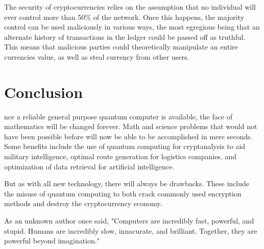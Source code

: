\documentclass[10pt,journal,compsoc]{IEEEtran}
\begin{document}
The security of cryptocurrencies relies on the assumption that no individual will ever control more than 50\% of the network\cite{Futurism}. Once this happens, the majority control can be used maliciously in various ways, the most egregious being that an alternate history of transactions in the ledger could be passed off as truthful. This means that malicious parties could theoretically manipulate an entire currencies value, as well as steal currency from other users. 







\section{Conclusion}
nce a reliable general purpose quantum computer is available, the face of mathematics will be changed forever. Math and science problems that would not have been possible before will now be able to be accomplished in mere seconds. Some benefits include the use of quantum computing for cryptanalysis to aid military intelligence, optimal route generation for logistics companies, and optimization of data retrieval for artificial intelligence. 

But as with all new technology, there will always be drawbacks. These include the misuse of quantum computing to both crack commonly used encryption methods and destroy the cryptocurrency economy.

As an unknown author once said, "Computers are incredibly fast, powerful, and stupid. Humans are incredibly slow, innacurate, and brilliant. Together, they are powerful beyond imagination."

\end{document}
